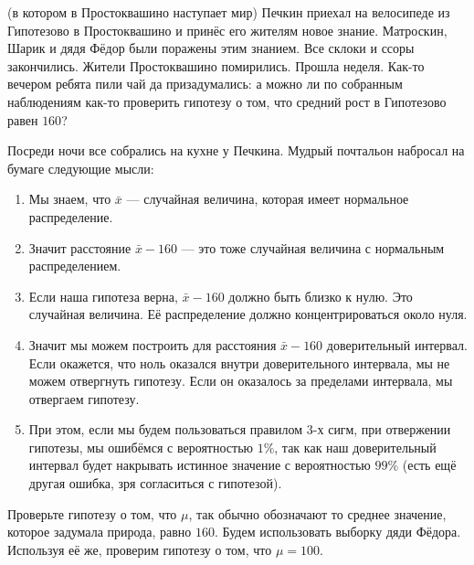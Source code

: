 \documentclass[12pt, a4paper, oneside]{article}
\begin{document}
\begin{problem}{(в котором в Простоквашино наступает мир)}
Печкин приехал на велосипеде из Гипотезово в Простоквашино и принёс его жителям новое знание. Матроскин, Шарик и дядя Фёдор были поражены этим знанием. Все склоки и ссоры закончились. Жители Простоквашино помирились. Прошла неделя. Как-то вечером ребята пили чай да призадумались: а можно ли по собранным наблюдениям как-то проверить гипотезу о том, что средний рост в Гипотезово равен $160$?

Посреди ночи все собрались на кухне у Печкина. Мудрый почтальон набросал на бумаге следующие мысли: 

\begin{enumerate} 
	\renewcommand{\labelenumi}{\arabic{enumi})}
	\item  Мы знаем, что $\bar x $ --- случайная величина, которая имеет нормальное распределение.
	
	\item Значит расстояние  $\bar x - 160$ --- это тоже случайная величина с нормальным распределением.
	
	\item Если наша гипотеза верна, $\bar x - 160$ должно быть близко к нулю. Это случайная величина. Её распределение должно концентрироваться около нуля. 
	
	\item Значит мы можем построить для расстояния $\bar x - 160$ доверительный интервал. Если окажется,  что ноль оказался внутри доверительного интервала, мы не можем отвергнуть гипотезу. Если он оказалось за пределами интервала, мы отвергаем гипотезу. 
	
	\item При этом, если мы будем пользоваться правилом $3$-х сигм, при отвержении гипотезы, мы ошибёмся с вероятностью $1\%$, так как наш доверительный интервал будет накрывать истинное значение с вероятностью $99\%$ (есть ещё другая ошибка,  зря согласиться с гипотезой). 
\end{enumerate}

Проверьте гипотезу о том, что $\mu$, так обычно обозначают то среднее значение, которое задумала природа, равно $160$. Будем использовать выборку дяди Фёдора. Используя её же, проверим гипотезу о том, что  $\mu = 100$.
\end{problem}
\end{document}
